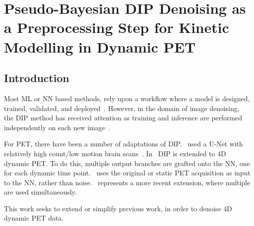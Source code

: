     \chapter{Pseudo-Bayesian DIP Denoising as a Preprocessing Step for Kinetic Modelling in Dynamic PET} \label{sec:pseudo_bayesian_dip_denoising_as_a_preprocessing_step_for_kinetic_modelling_in_dynamic_pet}
        \section{Introduction} \label{sec:pseudo_bayesian_dip_denoising_as_a_preprocessing_step_for_kinetic_modelling_in_dynamic_pet_appendix_introduction}
            Most \gls{ML} or \gls{NN} based methods, rely upon a workflow where a model is designed, trained, validated, and deployed~\cite{Krose2011AnNetworks}. %
            However, in the domain of image denoising, the \gls{DIP} method has received attention as training and inference are performed independently on each new image~\cite{Ulyanov2018DeepPrior}. %
            
            For \gls{PET}, there have been a number of adaptations of \gls{DIP}.~\cite{Gong2019PETPrior} used a U-Net with relatively high count/low motion brain scans~\cite{Weng2015U-Net:Segmentation}. In~\cite{Hashimoto20214DNetwork} \gls{DIP} is extended to \gls{4D} dynamic \gls{PET}. To do this, multiple output branches are grafted onto the \gls{NN}, one for each dynamic time point.~\cite{Hashimoto2019DynamicDatasets} uses the original or static \gls{PET} acquisition as input to the \gls{NN}, rather than noise.~\cite{Yang2022SimultaneousPrior} represents a more recent extension, where multiple  are used simultaneously.
            
            This work seeks to extend or simplify previous work, in order to denoise \gls{4D} dynamic \gls{PET} data.
        
            
